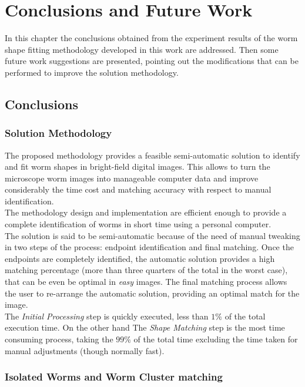 \thispagestyle{empty}
\cleardoublepage
\chapter{Conclusions and Future Work}

In this chapter the conclusions obtained from the experiment results of the 
worm shape fitting methodology developed in this work are addressed.
Then some future work suggestions are presented, pointing out the modifications
that can be performed to improve the solution methodology.

\section{Conclusions}

\subsection*{Solution Methodology}

The proposed methodology provides a feasible semi-automatic solution
to identify and fit worm shapes in bright-field digital images. This allows
to turn the microscope worm images into manageable computer data and 
improve considerably the time cost and matching accuracy with respect
to manual identification.\\
The methodology design and implementation are efficient enough to provide
a complete identification of worms in short time using a personal computer.\\
The solution is said to be semi-automatic because of the need of manual
tweaking in two steps of the process: endpoint identification and
final matching. Once the endpoints are completely identified, the automatic
solution provides a high matching percentage (more than three quarters of 
the total in the worst case), that can be even be optimal in \emph{easy} 
images. The final matching process allows the user to re-arrange the 
automatic solution, providing an optimal match for the image.\\
The \emph{Initial Processing} step is quickly executed, less than
$1\%$ of the total execution time. On the other hand The \emph{Shape Matching}
step is the most time consuming process, taking the $99\%$ of the total
time excluding the time taken for manual adjustments (though normally fast).

\subsection*{Isolated Worms and Worm Cluster matching}

